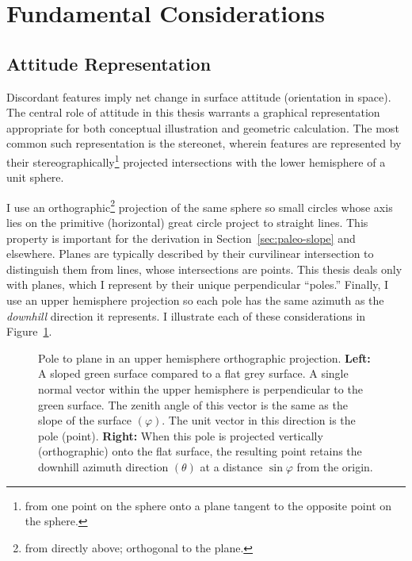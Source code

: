 \section{Fundamental Considerations}\label{sec:considerations}

\subsection{Attitude Representation}

Discordant features imply net change in surface attitude (orientation in space). The central role of attitude in this thesis warrants a graphical representation appropriate for both conceptual illustration and geometric calculation. The most common such representation is the stereonet, wherein features are represented by their stereographically\footnote{from one point on the sphere onto a plane tangent to the opposite point on the sphere.} projected intersections with the lower hemisphere of a unit sphere.

I use an orthographic\footnote{from directly above; orthogonal to the plane.} projection of the same sphere so small circles whose axis lies on the primitive (horizontal) great circle project to straight lines. This property is important for the derivation in Section~\ref{sec:paleo-slope} and elsewhere. Planes are typically described by their curvilinear intersection to distinguish them from lines, whose intersections are points. This thesis deals only with planes, which I represent by their unique perpendicular ``poles.'' Finally, I use an upper hemisphere projection so each pole has the same azimuth as the \emph{downhill} direction it represents. I illustrate each of these considerations in Figure~\ref{fig:surface}.


\begin{figure}
    \caption[Orthographic pole to plane]{Pole to plane in an upper hemisphere orthographic projection. \textbf{Left:} A sloped green surface compared to a flat grey surface. A single normal vector within the upper hemisphere is perpendicular to the green surface. The zenith angle of this vector is the same as the slope of the surface $(\varphi)$. The unit vector in this direction is the pole (point). \textbf{Right:} When this pole is projected vertically (orthographic) onto the flat surface, the resulting point retains the downhill azimuth direction $(\theta)$ at a distance $\sin\varphi$ from the origin.}%
    \label{fig:surface}%
\end{figure}

